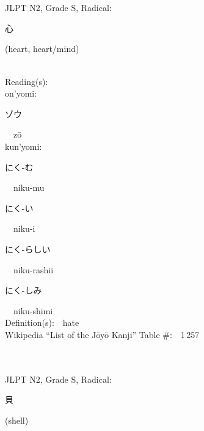 \begin{multicols}{2}
\ \ \\
{\fontsize{34pt}{40pt}  }\ \ \\  %
{JLPT N2, Grade S, Radical:\ \ {\begin{CJK}{UTF8}{min} 心 \end{CJK}} (heart, heart/mind) } \\
Reading(s):\ \ \\
{\hspace*{1em}}on'yomi:\ \ \\
{\hspace*{2em}}{\begin{CJK}{UTF8}{min} ゾウ \end{CJK}}\ \ z\=o\ \ \\
{\hspace*{1em}}kun'yomi:\ \ \\
{\hspace*{2em}}{\begin{CJK}{UTF8}{min} にく-む \end{CJK}}\ \ niku-mu\ \ \\
{\hspace*{2em}}{\begin{CJK}{UTF8}{min} にく-い \end{CJK}}\ \ niku-i\ \ \\
{\hspace*{2em}}{\begin{CJK}{UTF8}{min} にく-らしい \end{CJK}}\ \ niku-rashii\ \ \\
{\hspace*{2em}}{\begin{CJK}{UTF8}{min} にく-しみ \end{CJK}}\ \ niku-shimi\ \ \\
Definition(s):\ \ hate \\
Wikipedia ``List of the J\=oy\=o Kanji'' Table \#:\ \ 1\,257 \\
\ \ \\
{\fontsize{34pt}{40pt}  }\ \ \\  %
{JLPT N2, Grade S, Radical:\ \ {\begin{CJK}{UTF8}{min} 貝 \end{CJK}} (shell) } \\

\end{multicols}
